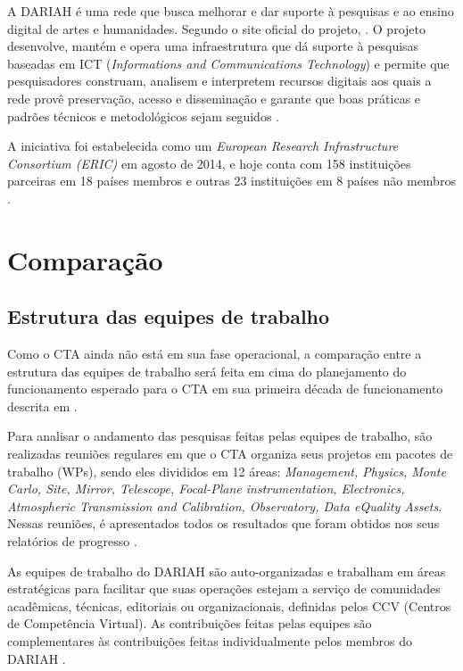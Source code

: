 \documentclass[10pt, conference, compsocconf]{IEEEtran}
\begin{document}
A DARIAH é uma rede que busca melhorar e dar suporte à pesquisas e ao ensino digital de artes e humanidades. Segundo o site oficial do projeto, . O projeto desenvolve, mantém e opera uma infraestrutura que dá suporte à pesquisas baseadas em ICT (\textit{Informations and Communications Technology}) e permite que pesquisadores construam, analisem e interpretem recursos digitais aos quais a rede provê preservação, acesso e disseminação e garante que boas práticas e padrões técnicos e metodológicos sejam seguidos \cite{DARIAH_about}.

A iniciativa foi estabelecida como um \textit{European Research Infrastructure Consortium (ERIC)} em agosto de 2014, e hoje conta com 158 instituições parceiras em 18 países membros e outras 23 instituições em 8 países não membros \cite{DARIAH_partners}.

\section{Comparação}
\subsection{Estrutura das equipes de trabalho}
Como o CTA ainda não está em sua fase operacional, a comparação entre a estrutura das equipes de trabalho será feita em cima do planejamento do funcionamento esperado para o CTA em sua primeira década de funcionamento descrita em \cite{1709.07997}.

Para analisar o andamento das pesquisas feitas pelas equipes de trabalho, são realizadas reuniões regulares em que o CTA organiza seus projetos em pacotes de trabalho (WPs), sendo eles divididos em 12 áreas: \textit{Management, Physics, Monte Carlo, Site, Mirror, Telescope, Focal-Plane instrumentation, Electronics, Atmospheric Transmission and Calibration, Observatory, Data eQuality Assets}. Nessas reuniões, é apresentados todos os resultados que foram obtidos nos seus relatórios de progresso \cite{}.

As equipes de trabalho do DARIAH são auto-organizadas e trabalham em áreas estratégicas para facilitar que suas operações estejam a serviço de comunidades acadêmicas, técnicas, editoriais ou organizacionais, definidas pelos CCV (Centros de Competência Virtual). As contribuições feitas pelas equipes são complementares às contribuições feitas individualmente pelos membros do DARIAH \cite{EGI_dariah_Working_Groups}.
\end{document}
